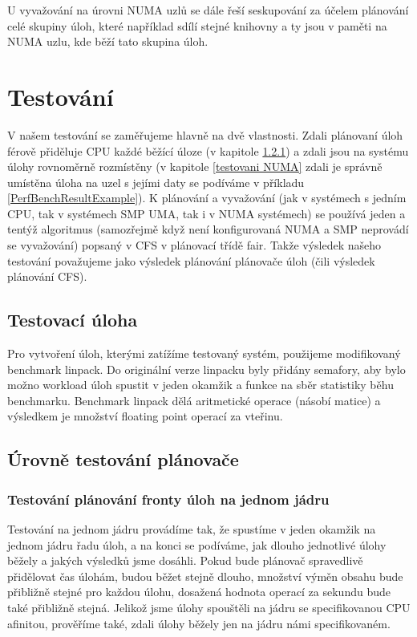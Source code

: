 \documentclass[
  master=true,
  font=sans,
  printversion=false,
  joinlists=true,
  figures=true,
  tables=true,
  sourcecodes=false,
  theorems=false,
  bibencoding=utf8,
  language=czech,
  encoding=utf8,
  field=ainfk,
  biblatex,
  glossaries,
  index
]{kidiplom}
\begin{document}
U vyvažování na úrovni NUMA uzlů se dále řeší seskupování za účelem plánování celé skupiny úloh, které například sdílí stejné knihovny a ty jsou v paměti na NUMA uzlu, kde běží tato skupina úloh. 


\section{Testování}

V našem testování se zaměřujeme hlavně na dvě vlastnosti. Zdali plánovaní úloh férově přiděluje CPU každé běžící úloze (v kapitole \ref{testovani jedno jadro})  a zdali jsou na systému úlohy rovnoměrně rozmístěny (v kapitole \ref{testovani NUMA} zdali je správně umístěna úloha na uzel s jejími daty se podíváme v příkladu \ref{PerfBenchResultExample}). K plánování a vyvažování (jak v systémech s jedním CPU, tak v systémech SMP UMA, tak i v NUMA systémech) se používá jeden a tentýž algoritmus (samozřejmě když není konfigurovaná NUMA a SMP neprovádí se vyvažování) popsaný v CFS v plánovací třídě fair. Takže výsledek našeho testování považujeme jako výsledek plánování plánovače úloh (čili výsledek plánování CFS). 

\subsection{Testovací úloha}
Pro vytvoření úloh, kterými zatížíme testovaný systém, použijeme modifikovaný benchmark linpack. Do originální verze linpacku byly přidány semafory, aby bylo možno workload úloh spustit v jeden okamžik a funkce na sběr statistiky běhu benchmarku. Benchmark linpack dělá aritmetické operace (násobí matice) a výsledkem je množství floating point operací za vteřinu. 

\subsection{Úrovně testování plánovače}

\subsubsection{Testování plánování fronty úloh na jednom jádru}
\label{testovani jedno jadro}
Testování na jednom jádru provádíme tak, že spustíme v jeden okamžik na jednom jádru řadu úloh, a na konci se podíváme, jak dlouho jednotlivé úlohy běžely a jakých výsledků jsme dosáhli. Pokud bude plánovač spravedlivě přidělovat čas úlohám, budou běžet stejně dlouho, množství výměn obsahu bude přibližně stejné pro každou úlohu, dosažená hodnota operací za sekundu bude také přibližně stejná. Jelikož jsme úlohy spouštěli na jádru se specifikovanou CPU afinitou, prověříme také, zdali úlohy běžely jen na jádru námi specifikovaném.
\end{document}
